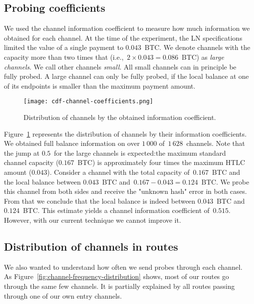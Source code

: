 \subsection{Probing coefficients}

We used the channel information coefficient to measure how much information we obtained for each channel.
At the time of the experiment, the LN specifications limited the value of a single payment to $0.043$~BTC\@.
We denote channels with the capacity more than two times that (i.e.,~$2 \times 0.043 = 0.086$~BTC) as \textit{large channels}.
We call other channels \textit{small}.
All small channels can in principle be fully probed.
A large channel can only be fully probed, if the local balance at one of its endpoints is smaller than the maximum payment amount.

\begin{figure}[ht]
	\centering
	\texttt{[image: cdf-channel-coefficients.png]}
	\caption{Distribution of channels by the obtained information coefficient.}
	\label{fig:cdf-channel-coefficients}
\end{figure}

Figure~\ref{fig:cdf-channel-coefficients} represents the distribution of channels by their information coefficients.
We obtained full balance information on over $1\,000$ of~$1\,628$~channels.
Note that the jump at $0.5$~for the large channels is expected:the maximum standard channel capacity ($0.167$~BTC) is approximately four times the maximum HTLC amount ($0.043$).
Consider a channel with the total capacity of~$0.167$~BTC and the local balance between $0.043$~BTC and~$0.167 - 0.043 = 0.124$~BTC\@.
We probe this channel from both sides and receive the "unknown hash" error in both cases.
From that we conclude that the local balance is indeed between $0.043$~BTC and~$0.124$~BTC\@.
This estimate yields a channel information coefficient of~$0.515$.
However, with our current technique we cannot improve it.

\subsection{Distribution of channels in routes}

We also wanted to understand how often we send probes through each channel.
As Figure~\ref{fig:channel-frequency-distribution} shows, most of our routes go through the same few channels.
It is partially explained by all routes passing through one of our own entry channels.

